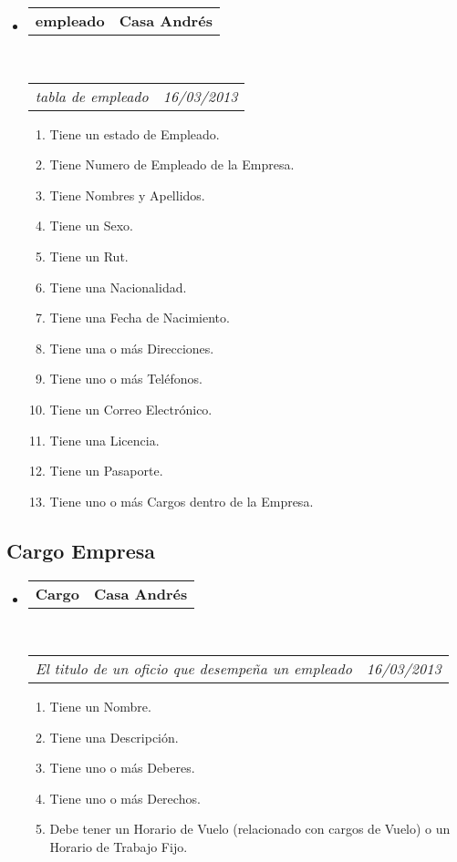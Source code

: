 \documentclass[10pt,letterpaper]{article}
\makeatletter
\newcommand{\headerrow}[2]
{\begin{tabular*}{\linewidth}{l@{\extracolsep{\fill}}r}
	#1 &
	#2 \\
\end{tabular*}}
\makeatother
\begin{document}
\begin{itemize}
	\parskip=0.1em

	\item
	\headerrow
		{\textbf{empleado}}
		{\textbf{Casa Andrés}}
	\\
	\headerrow
		{\emph{tabla de empleado}}
		{\emph{16/03/2013}}
	\begin{enumerate}
		\item Tiene un estado de Empleado.
		\item Tiene Numero de Empleado de la Empresa.
		\item Tiene Nombres y Apellidos.
		\item Tiene un Sexo.
		\item Tiene un Rut.
		\item Tiene una Nacionalidad.
		\item Tiene una Fecha de Nacimiento.
		\item Tiene una o más Direcciones.
		\item Tiene uno o más Teléfonos.
		\item Tiene un Correo Electrónico.
		\item Tiene una Licencia.
		\item Tiene un Pasaporte.
		\item Tiene uno o más Cargos dentro de la Empresa.
		
		
	\end{enumerate}

\end{itemize}


\subsection*{Cargo Empresa}

\begin{itemize}
	\parskip=0.1em

	\item
	\headerrow
		{\textbf{Cargo}}
		{\textbf{Casa Andrés}}
	\\
	\headerrow
		{\emph{El titulo de un oficio que desempeña un empleado}}
		{\emph{16/03/2013}}
	\begin{enumerate}
		\item Tiene un Nombre.
		\item Tiene una Descripción.
		\item Tiene uno o más Deberes.
		\item Tiene uno o más Derechos.
		\item Debe tener un Horario de Vuelo (relacionado con cargos de Vuelo) o un Horario de Trabajo Fijo.
	\end{enumerate}

\end{itemize}
\end{document}
